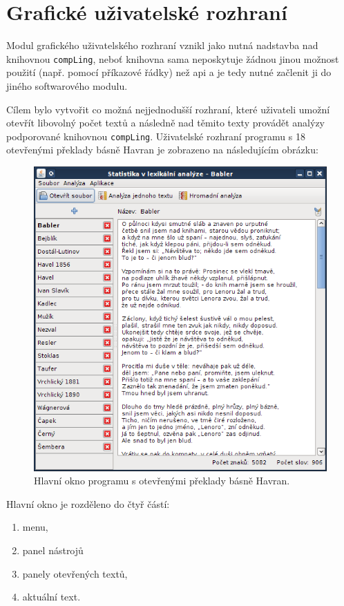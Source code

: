 \documentclass[dp.tex]{subfiles}
\begin{document}
\section{Grafické uživatelské rozhraní}

Modul grafického uživatelského rozhraní vznikl jako nutná nadstavba nad knihovnou \texttt{compLing}, neboť knihovna sama neposkytuje žádnou jinou možnost použití (např. pomocí příkazové řádky) než \acrshort{api} a je tedy nutné začlenit ji do jiného softwarového modulu.

Cílem bylo vytvořit co možná nejjednodušší rozhraní, které uživateli umožní otevřít libovolný počet textů a následně nad těmito texty provádět analýzy podporované knihovnou \texttt{compLing}. Uživatelské rozhraní programu s 18 otevřenými překlady básně Havran je zobrazeno na následujícím obrázku:

\begin{figure}[H]
	\centering
	\includegraphics[max width=\textwidth,keepaspectratio=true]{imgs-60-aplikace/gui-main-window}
	\caption{Hlavní okno programu s otevřenými překlady básně Havran.}
\end{figure}

Hlavní okno je rozděleno do čtyř částí:

\begin{enumerate}
	\item menu,
	\item panel nástrojů
	\item panely otevřených textů,
	\item aktuální text.
\end{enumerate}
\end{document}
